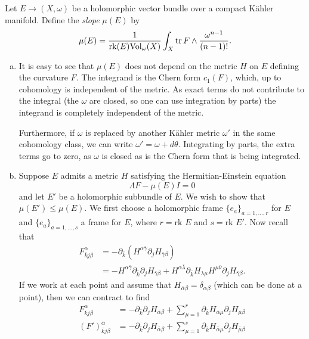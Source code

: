 \documentclass{../mathnotes}
\begin{document}
Let $E\to (X,\omega)$ be a holomorphic vector bundle over a compact K\"ahler manifold. Define the \textit{slope} $\mu(E)$
by
\[\mu(E)=\frac{1}{\text{rk}(E)\text{Vol}_\omega(X)}\int_X\operatorname{tr} F\wedge\frac{\omega^{n-1}}{(n-1)!}.\]
\begin{enumerate}[(a)]
    \item It is easy to see that $\mu(E)$ does not depend on the metric $H$ on $E$ defining the curvature $F$.
        The integrand is the Chern form $c_1(F)$, which, up to cohomology is independent of the metric. As
        exact terms do not contribute to the integral (the $\omega$ are closed, so one can use integration by parts)
        the integrand is completely independent of the metric.

        Furthermore, if $\omega$ is replaced by another K\"ahler metric $\omega'$ in the same cohomology class,
        we can write $\omega'=\omega+d\theta$. Integrating by parts, the extra terms go to zero, as $\omega$ is closed
        as is the Chern form that is being integrated.
    \item Suppose $E$ admits a metric $H$ satisfying the Hermitian-Einstein equation
        \[\Lambda F-\mu(E)I=0\]
        and let $E'$ be a holomorphic subbundle of $E$. We wish to show that $\mu(E')\leq\mu(E)$.
        We first choose a holomorphic frame $\{e_a\}_{a=1,\ldots,r}$ for $E$ and $\{e_a\}_{a=1,\ldots,s}$
        a frame for $E$, where $r=\text{rk } E$ and $s=\text{rk } E'$. Now recall that
        \begin{align*}
            F_{\bar kj\beta}^\alpha &= -\partial_{\bar k}\left( H^{\alpha\bar\gamma}\partial_j H_{\bar \gamma\beta} \right)\\
            &= -H^{\alpha\bar\gamma}\partial_{\bar k}\partial_j H_{\bar\gamma\beta}+H^{\alpha\bar\lambda}\partial_{\bar k}H_{\lambda\mu}H^{\mu\bar\nu}\partial_jH_{\bar\gamma\beta}.
        \end{align*}
        If we work at each point and assume that $H_{\bar\alpha\beta}=\delta_{\alpha\beta}$ (which can be done at a point), then 
        we can contract to find
        \begin{align*}
            F_{\bar kj\beta}^\alpha &= -\partial_{\bar k}\partial_jH_{\bar\alpha\beta}+\sum_{\mu=1}^r\partial_{\bar k}H_{\bar\alpha\mu}\partial_jH_{\bar\mu\beta}\\
            (F')_{\bar kj\beta}^{\alpha} &= -\partial_{\bar k}\partial_jH_{\bar\alpha\beta}+\sum_{\mu=1}^s\partial_{\bar k}H_{\bar\alpha\mu}\partial_jH_{\bar\mu\beta}
        \end{align*}

\end{enumerate}
\end{document}
